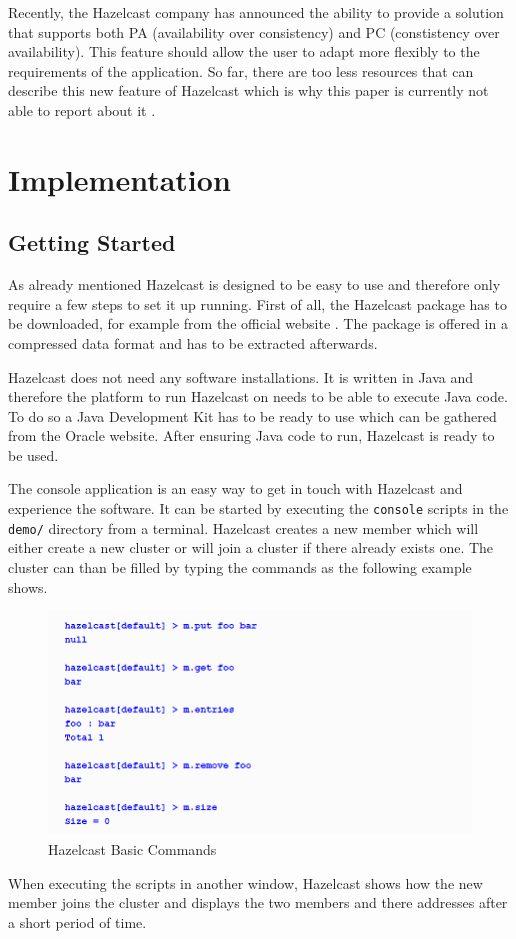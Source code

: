 Recently, the Hazelcast company has announced the ability to provide a solution that supports both PA (availability over consistency) and PC (constistency over availability). This feature should allow the user to adapt more flexibly to the requirements of the application. So far, there are too less resources that can describe this new feature of Hazelcast which is why this paper is currently not able to report about it \parencite{hazelcastCAP}.

\section{Implementation}
\subsection*{Getting Started}
As already mentioned Hazelcast is designed to be easy to use and therefore only require a few steps to set it up running.
First of all, the Hazelcast package has to be downloaded, for example from the official website \parencite{hazelcast:hazelcastDownload}. The package is offered in a compressed data format and has to be extracted afterwards.

Hazelcast does not need any software installations. It is written in Java and therefore the platform to run Hazelcast on needs to be able to execute Java code. To do so a Java Development Kit has to be ready to use which can be gathered from the Oracle website. After ensuring Java code to run, Hazelcast is ready to be used.

The console application is an easy way to get in touch with Hazelcast and experience the software. It can be started by executing the \texttt{console} scripts in the \texttt{demo/} directory from a terminal. Hazelcast creates a new member which will either create a new cluster or will join a cluster if there already exists one. The cluster can than be filled by typing the commands as the following example shows.
\begin{flushleft}
\begin{figure}[h]
    \includegraphics{img/hazelcastPut.PNG} 
    \caption{Hazelcast Basic Commands \parencite{johns2015}}
\end{figure}
\end{flushleft}
When executing the scripts in another window, Hazelcast shows how the new member joins the cluster and displays the two members and there addresses after a short period of time.

